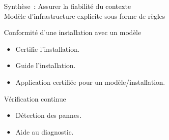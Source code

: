 \begin{frame}{Synthèse~: Assurer la fiabilité du contexte\\
Modèle d'infrastructure explicite sous forme de règles~\cite{carteron2016improving}
}
\begin{coloredbox}[checked]{Conformité d'une installation avec un modèle}
  \begin{itemize}%
  \item Certifie l'installation.
  \item Guide l'installation.
  \item Application certifiée pour un modèle/installation.
  \end{itemize}
\end{coloredbox}
\vfill
\begin{coloredbox}[checked]{Vérification continue}
  \begin{itemize}
  \item Détection des pannes.
  \item Aide au diagnostic.
  \end{itemize}
\end{coloredbox}
\vfill

\end{frame}


